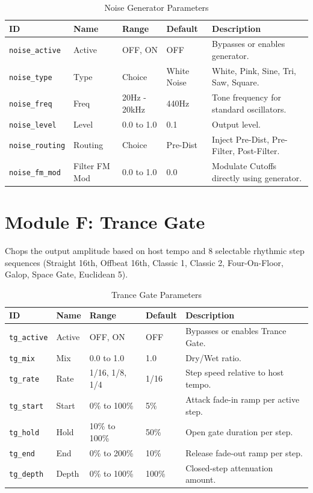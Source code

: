 \documentclass[11pt,a4paper,oneside]{book}
\begin{document}
\begin{table}[h]
    \centering
    \caption{Noise Generator Parameters}
    \begin{tabular}{lllll}
        \toprule
        \textbf{ID} & \textbf{Name} & \textbf{Range} & \textbf{Default} & \textbf{Description} \\
        \midrule
        \texttt{noise\_active} & Active & OFF, ON & OFF & Bypasses or enables generator. \\
        \texttt{noise\_type} & Type & Choice & White Noise & White, Pink, Sine, Tri, Saw, Square. \\
        \texttt{noise\_freq} & Freq & 20Hz - 20kHz & 440Hz & Tone frequency for standard oscillators. \\
        \texttt{noise\_level} & Level & 0.0 to 1.0 & 0.1 & Output level. \\
        \texttt{noise\_routing} & Routing & Choice & Pre-Dist & Inject Pre-Dist, Pre-Filter, Post-Filter. \\
        \texttt{noise\_fm\_mod} & Filter FM Mod & 0.0 to 1.0 & 0.0 & Modulate Cutoffs directly using generator. \\
        \bottomrule
    \end{tabular}
\end{table}

\section{Module F: Trance Gate}
Chops the output amplitude based on host tempo and 8 selectable rhythmic step sequences (Straight 16th, Offbeat 16th, Classic 1, Classic 2, Four-On-Floor, Galop, Space Gate, Euclidean 5).

\begin{table}[h]
    \centering
    \caption{Trance Gate Parameters}
    \begin{tabular}{lllll}
        \toprule
        \textbf{ID} & \textbf{Name} & \textbf{Range} & \textbf{Default} & \textbf{Description} \\
        \midrule
        \texttt{tg\_active} & Active & OFF, ON & OFF & Bypasses or enables Trance Gate. \\
        \texttt{tg\_mix} & Mix & 0.0 to 1.0 & 1.0 & Dry/Wet ratio. \\
        \texttt{tg\_rate} & Rate & 1/16, 1/8, 1/4 & 1/16 & Step speed relative to host tempo. \\
        \texttt{tg\_start} & Start & 0\% to 100\% & 5\% & Attack fade-in ramp per active step. \\
        \texttt{tg\_hold} & Hold & 10\% to 100\% & 50\% & Open gate duration per step. \\
        \texttt{tg\_end} & End & 0\% to 200\% & 10\% & Release fade-out ramp per step. \\
        \texttt{tg\_depth} & Depth & 0\% to 100\% & 100\% & Closed-step attenuation amount. \\
        \bottomrule
    \end{tabular}
\end{table}
\end{document}
